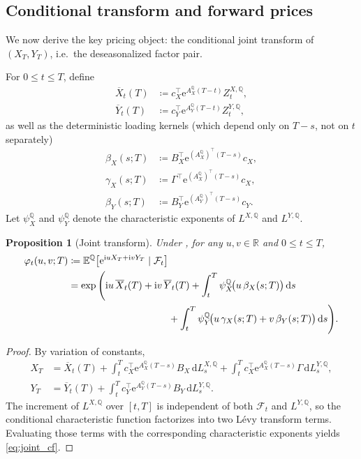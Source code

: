 \documentclass[10pt,reqno]{amsart}
\newtheorem{proposition}[theorem]{Proposition}
\newcommand{\R}{\mathbb{R}}
\newcommand{\E}{\mathbb{E}}
\newcommand{\Q}{\mathbb{Q}}
\newcommand{\F}{\mathcal{F}}
\newcommand{\1}{\mathbbm{1}}
\newcommand{\dd}{\mathrm{d}}
\newcommand{\ii}{\mathrm{i}}
\newcommand{\ee}{\mathrm{e}}
\begin{document}
\subsection{Conditional transform and forward prices}

We now derive the key pricing object: the conditional joint transform of
$(X_T,Y_T)$, i.e.\ the deseasonalized factor pair.

For $0 \le t \le T$, define
\begin{align*}
  \overline{X}_t(T)
    &\coloneqq c_X^\top \ee^{A_X^\Q (T-t)} Z_t^{X,\Q},\\
  \overline{Y}_t(T)
    &\coloneqq c_Y^\top \ee^{A_Y^\Q (T-t)} Z_t^{Y,\Q},
\end{align*}
as well as the deterministic loading kernels (which depend only on $T-s$,
not on $t$ separately)
\begin{align}
  \beta_X(s;T)
    &\coloneqq B_X^\top \ee^{(A_X^\Q)^\top (T-s)} c_X,
    \label{eq:betaX}\\
  \gamma_X(s;T)
    &\coloneqq \Gamma^\top \ee^{(A_X^\Q)^\top (T-s)} c_X,
    \label{eq:gammaX}\\
  \beta_Y(s;T)
    &\coloneqq B_Y^\top \ee^{(A_Y^\Q)^\top (T-s)} c_Y.
    \label{eq:betaY}
\end{align}
Let $\psi_X^\Q$ and $\psi_Y^\Q$ denote the characteristic exponents of
$L^{X,\Q}$ and $L^{Y,\Q}$.

\begin{proposition}[Joint transform]
\label{prop:joint_cf}
Under , for any $u,v \in \R$ and $0 \le t \le T$,
\begin{align}
  \varphi_t(u,v;T)
  &\coloneqq \E^\Q\!\left[
      \ee^{\ii u X_T + \ii v Y_T}
      \mid \F_t
    \right] \nonumber\\
  &= \exp\Bigg(
      \ii u\, \overline{X}_t(T)
      + \ii v\, \overline{Y}_t(T)
      + \int_t^T \psi_X^\Q\!\big(u\,\beta_X(s;T)\big)\,\dd s
      \nonumber\\
      &\hspace{3.6cm}
      + \int_t^T \psi_Y^\Q\!\big(
          u\,\gamma_X(s;T)
          + v\,\beta_Y(s;T)
        \big)\,\dd s
    \Bigg).
    \label{eq:joint_cf}
\end{align}
\end{proposition}

\begin{proof}
By variation of constants,
\begin{align*}
  X_T
  &= \overline{X}_t(T)
     + \int_t^T c_X^\top \ee^{A_X^\Q(T-s)} B_X\,\dd L_s^{X,\Q}
     + \int_t^T c_X^\top \ee^{A_X^\Q(T-s)} \Gamma\,\dd L_s^{Y,\Q},\\
  Y_T
  &= \overline{Y}_t(T)
     + \int_t^T c_Y^\top \ee^{A_Y^\Q(T-s)} B_Y\,\dd L_s^{Y,\Q}.
\end{align*}
The increment of $L^{X,\Q}$ over $[t,T]$ is independent of both $\F_t$
and $L^{Y,\Q}$, so the conditional characteristic function factorizes into two
Lévy transform terms. Evaluating those terms with the corresponding
characteristic exponents yields \eqref{eq:joint_cf}.
\end{proof}
\end{document}
